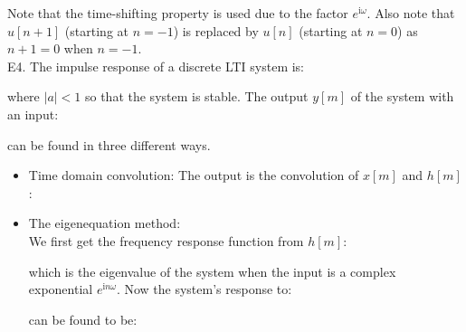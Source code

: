	\begin{tcolorbox}[colframe=black,colback=white,sharp corners]
	
	Note that the time-shifting property is used due to the factor $e^{\mathrm{i}\omega}$. Also note that $u[n+1]$ (starting at $n=-1$) is replaced by $u[n]$ (starting at $n=0$) as $n+1=0$ when $n=-1$.\\
	
	E4. The impulse response of a discrete LTI system is:
	
	where $|a|<1$ so that the system is stable. The output $y[m]$ of the system with an input:
	
	can be found in three different ways.
	\begin{itemize}
		\item Time domain convolution: 
		The output is the convolution of $x[m]$ and $h[m]$:
		
		
		\item The eigenequation method:\\ 
	
		We first get the frequency response function from $h[m]$:
		
		which is the eigenvalue of the system when the input is a complex exponential $e^{\mathrm{i}n\omega}$. Now the system's response to: 
		
		can be found to be:
		
	\end{itemize}
	
	\end{tcolorbox}
	
